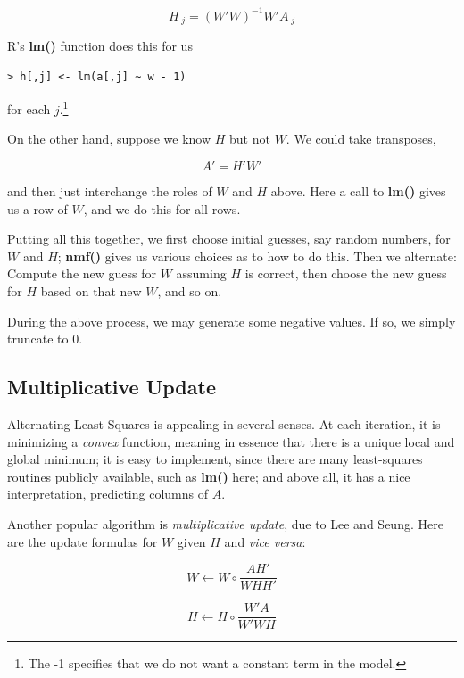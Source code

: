 \begin{equation}
H_{\cdot j} = (W'W)^{-1} W' A_{\cdot j}
\end{equation}

R's {\bf lm()} function does this for us

\begin{lstlisting}
> h[,j] <- lm(a[,j] ~ w - 1)
\end{lstlisting}

for each $j$.\footnote{The -1 specifies that we do not want a constant term in
the model.}

On the other hand, suppose we know $H$ but not $W$.  We could take 
transposes,

\begin{equation}
A' = H' W'
\end{equation}

and then just interchange the roles of $W$ and $H$ above.  Here a call
to {\bf lm()} gives us a row of $W$, and we do this for all rows.

Putting all this together, we first choose initial guesses, say random
numbers, for $W$ and $H$; {\bf nmf()} gives us various choices as to how
to do this.  Then we alternate: Compute the new guess for $W$ assuming
$H$ is correct, then choose the new guess for $H$ based on that new $W$,
and so on.

During the above process, we may generate some negative values.  If so,
we simply truncate to 0.

\subsection{Multiplicative Update}

Alternating Least Squares is appealing in several senses.  At each
iteration, it is minimizing a {\it convex} function, meaning in essence
that there is a unique local and global minimum; it is easy to
implement, since there are many least-squares routines publicly
available, such as {\bf lm()} here; and above all, it has a nice
interpretation, predicting columns of $A$.

Another popular algorithm is {\it multiplicative update}, due to Lee and
Seung.  Here are the update formulas for $W$ given $H$ and {\it vice
versa}:

\begin{equation}
W \leftarrow W \circ 
\frac
{AH'}
{WHH'}
\end{equation}

\begin{equation}
H \leftarrow H \circ 
\frac
{W'A}
{W'WH}
\end{equation}

